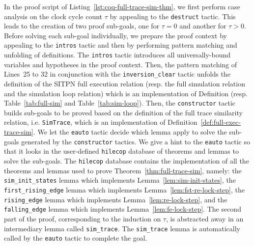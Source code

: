 \documentclass[pdflatex,sn-mathphys]{sn-jnl}%
\theoremstyle{thmstyleone}%
\theoremstyle{thmstyletwo}%
\theoremstyle{thmstylethree}%
\begin{document}
In the proof script of Listing~\ref{lst:coq-full-trace-sim-thm}, we
first perform case analysis on the clock cycle count $\tau$ by
appealing to the \texttt{destruct} tactic. This leads to the creation
of two proof sub-goals, one for $\tau=0$ and another for
$\tau>0$. Before solving each sub-goal individually, we prepare the
proof context by appealing to the \texttt{intros} tactic and then by
performing pattern matching and unfolding of definitions. The
\texttt{intros} tactic introduces all universally-bound variables and
hypotheses in the proof context. Then, the pattern matching of
Lines~25 to 32 in conjunction with the \texttt{inversion\_clear}
tactic unfolds the definition of the SITPN full execution relation
(resp. the \hvhdl{} full simulation relation and the \hvhdl{}
simulation loop relation) which is an implementation of Definition
(resp. Table~\ref{tab:full-sim} and Table~\ref{tab:sim-loop}).  Then, the
\texttt{constructor} tactic builds sub-goals to be proved based on the
definition of the full trace similarity relation,
i.e. \texttt{SimTrace}, which is an implementation of
Definition~\ref{def:full-exec-trace-sim}. We let the \texttt{eauto}
tactic decide which lemma apply to solve the sub-goals generated by
the \texttt{constructor} tactics. We give a hint to the \texttt{eauto}
tactic so that it looks in the user-defined \texttt{hilecop} database
of theorems and lemmas to solve the sub-goals. The \texttt{hilecop}
database contains the \coq{} implementation of all the theorems and
lemmas used to prove Theorem~\ref{thm:full-trace-sim}, namely: the
\texttt{sim\_init\_states} lemma which implements
Lemma~\ref{lem:sim-init-states}, the \texttt{first\_rising\_edge}
lemma which implements Lemma~\ref{lem:fst-re-lock-step}, the
\texttt{rising\_edge} lemma which implements
Lemma~\ref{lem:re-lock-step}, and the \texttt{falling\_edge} lemma
which implements Lemma~\ref{lem:fe-lock-step}.  The second part of the
proof, corresponding to the induction on $\tau$, is abstracted away in
an intermediary lemma called \texttt{sim\_trace}. The
\texttt{sim\_trace} lemma is automatically called by the
\texttt{eauto} tactic to complete the goal.

\end{document}
